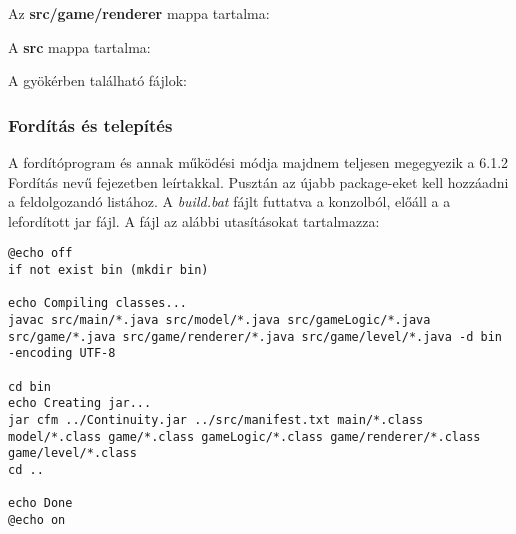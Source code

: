 Az \textbf{src/game/renderer} mappa tartalma:
\begin{filelist}
\end{filelist}

A \textbf{src} mappa tartalma:
\begin{filelist}
\end{filelist}


A gyökérben található fájlok:
\begin{filelist}
\end{filelist}

\newpage

\subsubsection{Fordítás és telepítés}
A fordítóprogram és annak működési módja majdnem teljesen megegyezik a 6.1.2 Fordítás nevű fejezetben leírtakkal. Pusztán az újabb package-eket kell hozzáadni a feldolgozandó listához. A \emph{build.bat} fájlt futtatva a konzolból, előáll a a lefordított jar fájl. A fájl az alábbi utasításokat tartalmazza:

\begin{verbatim}
@echo off
if not exist bin (mkdir bin)

echo Compiling classes...
javac src/main/*.java src/model/*.java src/gameLogic/*.java src/game/*.java src/game/renderer/*.java src/game/level/*.java -d bin -encoding UTF-8

cd bin
echo Creating jar...
jar cfm ../Continuity.jar ../src/manifest.txt main/*.class model/*.class game/*.class gameLogic/*.class game/renderer/*.class game/level/*.class
cd ..

echo Done
@echo on
\end{verbatim}

